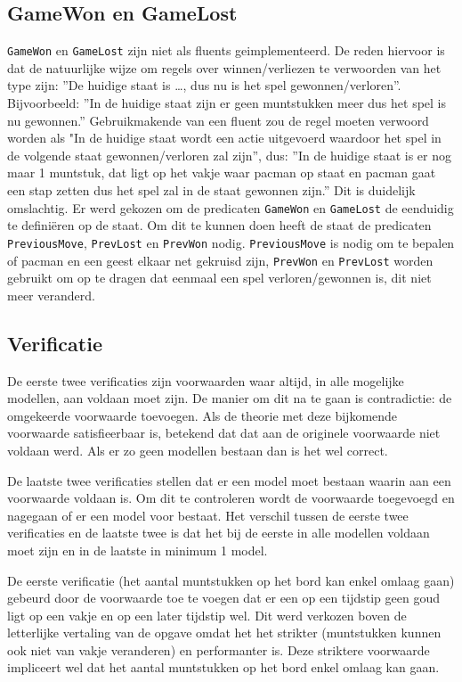 \documentclass[a4paper,12pt]{article}
\begin{document}
\subsection{GameWon en GameLost}
\texttt{GameWon} en \texttt{GameLost} zijn niet als fluents geimplementeerd. De reden hiervoor is dat de natuurlijke wijze om regels over winnen/verliezen te verwoorden van het type zijn: ''De huidige staat is \dots, dus nu is het spel gewonnen/verloren''. Bijvoorbeeld: ''In de huidige staat zijn er geen muntstukken meer dus het spel is nu gewonnen.'' Gebruikmakende van een fluent zou de regel moeten verwoord worden als "In de huidige staat wordt een actie uitgevoerd waardoor het spel in de volgende staat gewonnen/verloren zal zijn'', dus: ''In de huidige staat is er nog maar 1 muntstuk, dat ligt op het vakje waar pacman op staat en pacman gaat een stap zetten dus het spel zal in de staat gewonnen zijn.'' Dit is duidelijk omslachtig. Er werd gekozen om de predicaten \texttt{GameWon} en \texttt{GameLost} de eenduidig te defini\"eren op de staat. Om dit te kunnen doen heeft de staat de predicaten \texttt{PreviousMove}, \texttt{PrevLost} en \texttt{PrevWon} nodig. \texttt{PreviousMove}  is nodig om te bepalen of pacman en een geest elkaar net gekruisd zijn, \texttt{PrevWon} en \texttt{PrevLost} worden gebruikt om op te dragen dat eenmaal een spel verloren/gewonnen is, dit niet meer veranderd.

\subsection{Verificatie}
De eerste twee verificaties zijn voorwaarden waar altijd, in alle mogelijke modellen, aan voldaan moet zijn. De manier om dit na te gaan is contradictie: de omgekeerde voorwaarde toevoegen. Als de theorie met deze bijkomende voorwaarde satisfieerbaar is, betekend dat dat aan de originele voorwaarde niet voldaan werd. Als er zo geen modellen bestaan dan is het wel correct.

De laatste twee verificaties stellen dat er een model moet bestaan waarin aan een voorwaarde voldaan is. Om dit te controleren wordt de voorwaarde toegevoegd en nagegaan of er een model voor bestaat. Het verschil tussen de eerste twee verificaties en de laatste twee is dat het bij de eerste in alle modellen voldaan moet zijn en in de laatste in minimum 1 model.

De eerste verificatie (het aantal muntstukken op het bord kan enkel omlaag gaan) gebeurd door de voorwaarde toe te voegen dat er een op een tijdstip geen goud ligt op een vakje en op een later tijdstip wel. Dit werd verkozen boven de letterlijke vertaling van de opgave omdat het het strikter (muntstukken kunnen ook niet van vakje veranderen) en performanter is. Deze striktere voorwaarde impliceert wel dat het aantal muntstukken op het bord enkel omlaag kan gaan.
\end{document}
